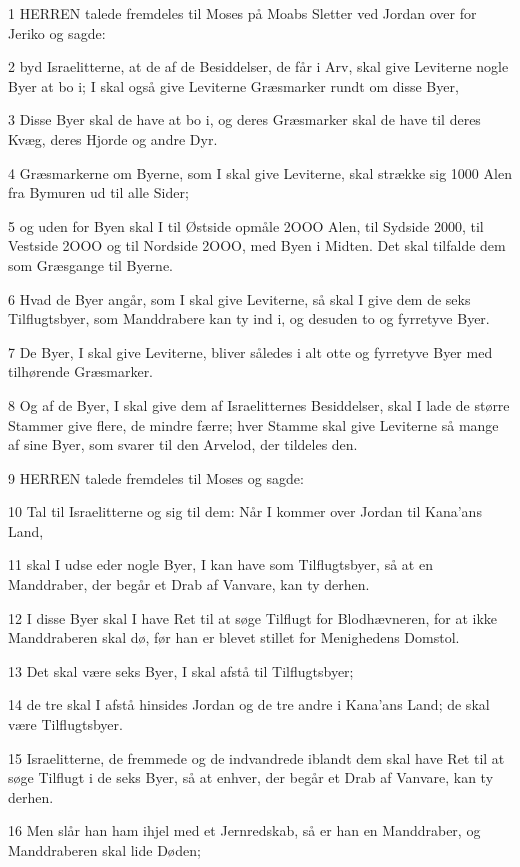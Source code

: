 \par 1 HERREN talede fremdeles til Moses på Moabs Sletter ved Jordan over for Jeriko og sagde:
\par 2 byd Israelitterne, at de af de Besiddelser, de får i Arv, skal give Leviterne nogle Byer at bo i; I skal også give Leviterne Græsmarker rundt om disse Byer,
\par 3 Disse Byer skal de have at bo i, og deres Græsmarker skal de have til deres Kvæg, deres Hjorde og andre Dyr.
\par 4 Græsmarkerne om Byerne, som I skal give Leviterne, skal strække sig 1000 Alen fra Bymuren ud til alle Sider;
\par 5 og uden for Byen skal I til Østside opmåle 2OOO Alen, til Sydside 2000, til Vestside 2OOO og til Nordside 2OOO, med Byen i Midten. Det skal tilfalde dem som Græsgange til Byerne.
\par 6 Hvad de Byer angår, som I skal give Leviterne, så skal I give dem de seks Tilflugtsbyer, som Manddrabere kan ty ind i, og desuden to og fyrretyve Byer.
\par 7 De Byer, I skal give Leviterne, bliver således i alt otte og fyrretyve Byer med tilhørende Græsmarker.
\par 8 Og af de Byer, I skal give dem af Israelitternes Besiddelser, skal I lade de større Stammer give flere, de mindre færre; hver Stamme skal give Leviterne så mange af sine Byer, som svarer til den Arvelod, der tildeles den.
\par 9 HERREN talede fremdeles til Moses og sagde:
\par 10 Tal til Israelitterne og sig til dem: Når I kommer over Jordan til Kana'ans Land,
\par 11 skal I udse eder nogle Byer, I kan have som Tilflugtsbyer, så at en Manddraber, der begår et Drab af Vanvare, kan ty derhen.
\par 12 I disse Byer skal I have Ret til at søge Tilflugt for Blodhævneren, for at ikke Manddraberen skal dø, før han er blevet stillet for Menighedens Domstol.
\par 13 Det skal være seks Byer, I skal afstå til Tilflugtsbyer;
\par 14 de tre skal I afstå hinsides Jordan og de tre andre i Kana'ans Land; de skal være Tilflugtsbyer.
\par 15 Israelitterne, de fremmede og de indvandrede iblandt dem skal have Ret til at søge Tilflugt i de seks Byer, så at enhver, der begår et Drab af Vanvare, kan ty derhen.
\par 16 Men slår han ham ihjel med et Jernredskab, så er han en Manddraber, og Manddraberen skal lide Døden;

